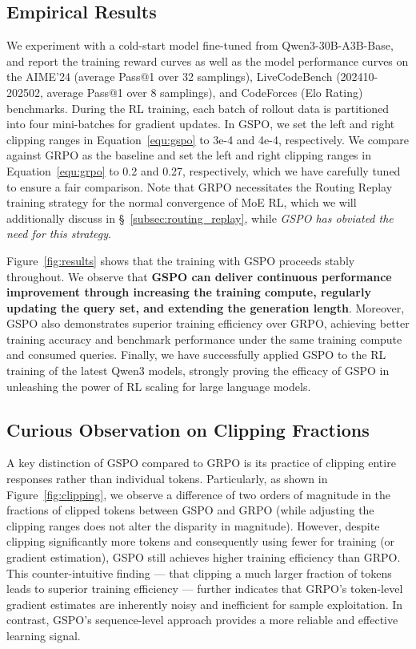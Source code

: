 \subsection{Empirical Results}

We experiment with a cold-start model fine-tuned from Qwen3-30B-A3B-Base, and report the training reward curves as well as the model performance curves on the AIME'24 (average Pass@1 over 32 samplings), LiveCodeBench (202410-202502, average Pass@1 over 8 samplings), and CodeForces (Elo Rating) benchmarks. During the RL training, each batch of rollout data is partitioned into four mini-batches for gradient updates. In GSPO, we set the left and right clipping ranges in Equation~\eqref{equ:gspo} to 3e-4 and 4e-4, respectively. We compare against GRPO as the baseline and set the left and right clipping ranges in Equation~\eqref{equ:grpo} to 0.2 and 0.27, respectively, which we have carefully tuned to ensure a fair comparison. Note that GRPO necessitates the Routing Replay training strategy for the normal convergence of MoE RL, which we will additionally discuss in \S~\ref{subsec:routing_replay}, while \textit{GSPO has obviated the need for this strategy}.

Figure~\ref{fig:results} shows that the training with GSPO proceeds stably throughout. We observe that \textbf{GSPO can deliver continuous performance improvement through increasing the training compute, regularly updating the query set, and extending the generation length}. Moreover, GSPO also demonstrates superior training efficiency over GRPO, achieving better training accuracy and benchmark performance under the same training compute and consumed queries. Finally, we have successfully applied GSPO to the RL training of the latest Qwen3 models, strongly proving the efficacy of GSPO in unleashing the power of RL scaling for large language models.

\subsection{Curious Observation on Clipping Fractions}

A key distinction of GSPO compared to GRPO is its practice of clipping entire responses rather than individual tokens. Particularly, as shown in Figure~\ref{fig:clipping}, we observe a difference of two orders of magnitude in the fractions of clipped tokens between GSPO and GRPO (while adjusting the clipping ranges does not alter the disparity in magnitude). However, despite clipping significantly more tokens and consequently using fewer for training (or gradient estimation), GSPO still achieves higher training efficiency than GRPO. This counter-intuitive finding — that clipping a much larger fraction of tokens leads to superior training efficiency — further indicates that GRPO's token-level gradient estimates are inherently noisy and inefficient for sample exploitation. In contrast, GSPO's sequence-level approach provides a more reliable and effective learning signal.

